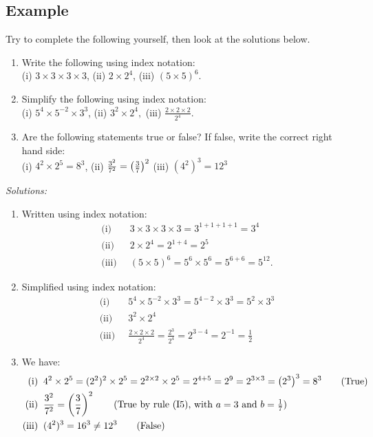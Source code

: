 \subsection{Example}
Try to complete the following yourself, then look at the solutions below.
\begin{enumerate}
\item Write the following using index notation: \\
(i) \;\; $3\times3\times3\times3$, \qquad (ii) \;\; $2\times2^4$, \qquad (iii) \;\;$(5\times5)^6$.

\item Simplify the following using index notation: \\
(i) \;\; $5^4\times5^{-2}\times3^3$, \qquad (ii)\;\; $3^2\times2^4,$ \qquad (iii) \;\;$\frac{2\times2\times2}{2^4}$.

\item Are the following statements true or false? If false, write the correct right hand side: \\
(i)\;\; $4^2 \times 2^5 = 8^3$, \qquad (ii) \;\; $\frac{3^2}{7^2} = \left(\frac{3}{7}\right)^2$ \qquad (iii) \;\; $(4^2)^3 = 12^3$
\end{enumerate}

\vspace{1.5cm}
\noindent \textit{Solutions:}
\begin{enumerate}
\item Written using index notation:
\begin{align*}
\text{(i)} & \;\; 3\times3\times3\times3 = 3^{1+1+1+1} = 3^4 \tag{using (I1)} \\
\text{(ii)} & \;\; 2\times2^4 = 2^{1+4} = 2^5 \tag{using (I1)} \\
\text{(iii)} & \;\; (5\times5)^6 = 5^6\times5^6 = 5^{6+6} = 5^{12} \tag{using (I5) and (I1)}.
\end{align*}
\item Simplified using index notation:
\begin{align*}
\text{(i)} & \;\; 5^4\times5^{-2}\times3^3 = 5^{4-2}\times3^3 = 5^2\times3^3 \tag{using (I1)} \\
\text{(ii)} & \;\; 3^2\times2^4 \tag{we can't do anything} \\
\text{(iii)} & \;\; \frac{2\times2\times2}{2^4} = \frac{2^3}{2^4} = 2^{3-4} = 2^{-1} = \frac{1}{2} \tag{using (I1) and (I4)}
\end{align*}
\item We have:
\begin{align*}
\text{(i)} & \;\; 4^2 \times 2^5 = (2^2)^2 \times 2^5 = 2^{2\times2}\times2^5 = 2^{4+5} = 2^9 = 2^{3\times3} = \brac{2^3}^3 = 8^3 \tag{True} \\
\text{(ii)} & \;\; \frac{3^2}{7^2} = \bfrac{3}{7}^2 \tag{True by rule (I5), with $a=3$ and $b = \frac{1}{7}$} \\
\text{(iii)} & \;\; (4^2)^3 = 16^3 \neq 12^3 \tag{False}
\end{align*}
\end{enumerate}

